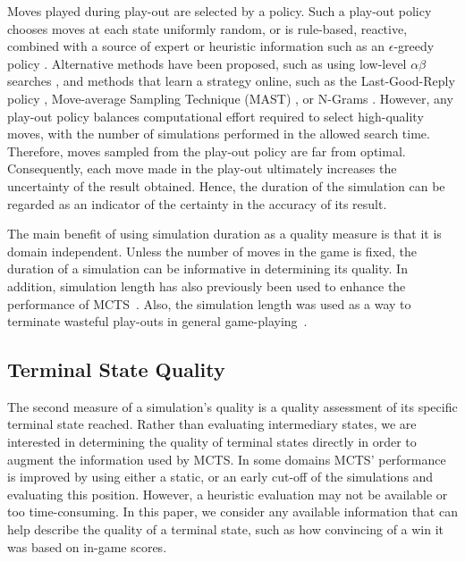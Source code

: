 \documentclass{ecai2014}
\begin{document}
Moves played during play-out are selected by a policy. Such a play-out policy chooses moves at each state uniformly random, or is rule-based, reactive, combined with a source of expert or heuristic information such as an $\epsilon$-greedy policy \cite{sturtevant2008analysis, sutton1998reinforcement}. Alternative methods have been proposed, such as using low-level $\alpha\beta$ searches \cite{Winands2011}, and methods that learn a strategy online, such as the Last-Good-Reply policy \cite{baier2010power}, Move-average Sampling Technique (MAST) \cite{finnsson2008simulation}, or N-Grams \cite{Tak2012}. However, any play-out policy balances computational effort required to select high-quality moves, with the number of simulations performed in the allowed search time. Therefore, moves sampled from the play-out policy are far from optimal. Consequently, each move made in the play-out ultimately increases the uncertainty of the result obtained. Hence, the duration of the simulation can be regarded as an indicator of the certainty in the accuracy of its result.

The main benefit of using simulation duration as a quality measure is that it is domain independent. Unless the number of moves in the game is fixed, the duration of a simulation can be informative in determining its quality. In addition, simulation length has also previously been used to enhance the performance of MCTS~\cite{Enzenberger10Fuego,keller13thts,roschke2013cc}. Also, the simulation length was used as a way to terminate wasteful play-outs in general game-playing~\cite{finnsson2012generalized}.

\subsection{Terminal State Quality}
\label{sub:termqual}

The second measure of a simulation's quality is a quality assessment of its specific terminal state reached. Rather than evaluating intermediary states, we are interested in determining the quality of terminal states directly in order to augment the information used by MCTS. In some domains MCTS' performance is improved by using either a static, or an early cut-off of the simulations and evaluating this position. However, a heuristic evaluation may not be available or too time-consuming. In this paper, we consider any available information that can help describe the quality of a terminal state, such as how convincing of a win it was based on in-game scores.  
\end{document}
